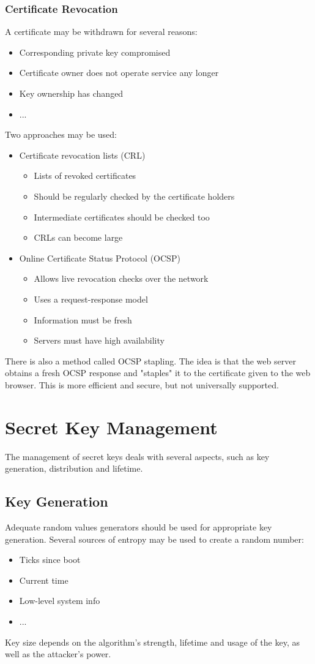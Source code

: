 \documentclass[10pt,a4paper]{report}
\begin{document}
\subsubsection{Certificate Revocation}
A certificate may be withdrawn for several reasons:
\begin{itemize}
\item Corresponding private key compromised
\item Certificate owner does not operate service any longer
\item Key ownership has changed
\item ...
\end{itemize}
Two approaches may be used:
\begin{itemize}
\item Certificate revocation lists (CRL)
\begin{itemize}
\item Lists of revoked certificates
\item Should be regularly checked by the certificate holders
\item Intermediate certificates should be checked too
\item CRLs can become large
\end{itemize}
\item Online Certificate Status Protocol (OCSP)
\begin{itemize}
\item Allows live revocation checks over the network
\item Uses a request-response model
\item Information must be fresh
\item Servers must have high availability
\end{itemize}
\end{itemize}
There is also a method called OCSP stapling. The idea is that the web server obtains a fresh OCSP response and
"staples" it to the certificate given to the web browser. This is more efficient and secure, but not universally supported.

\section{Secret Key Management}
The management of secret keys deals with several aspects, such as key generation, distribution and lifetime.
\subsection{Key Generation}
Adequate random values generators should be used for appropriate key generation. Several sources of entropy may be used to create a random number:
\begin{itemize}
\item Ticks since boot
\item Current time
\item Low-level system info
\item ...
\end{itemize}
Key size depends on the algorithm's strength, lifetime and usage of the key, as well as the attacker's power.
\end{document}
